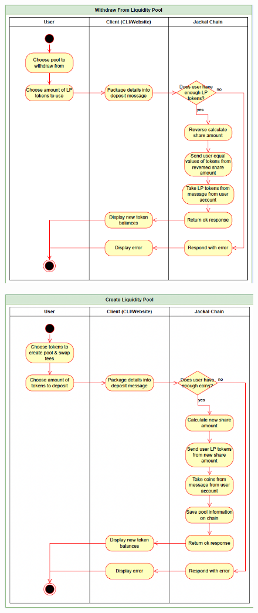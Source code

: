 \documentclass[a4paper]{article}
\begin{document}
\begin{figure}[!htbp]
\centering
\includegraphics[width=1\textwidth]{assets/lp3.png}
\caption{}
\end{figure}

\begin{figure}[!htbp]
\centering
\includegraphics[width=1\textwidth]{assets/lp4.png}
\caption{}
\end{figure}
\end{document}
